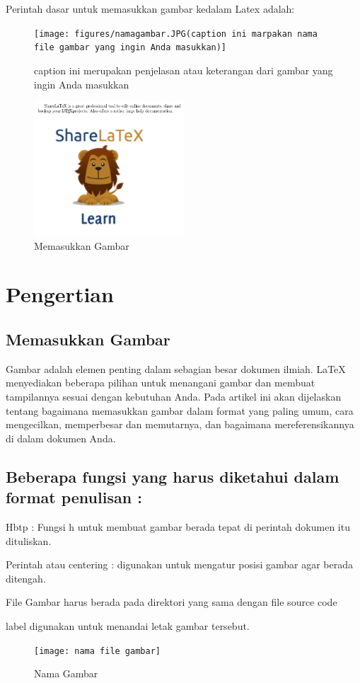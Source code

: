 Perintah dasar untuk memasukkan gambar kedalam Latex adalah:
\begin{figure}[ht]
\centerline{\texttt{[image: figures/namagambar.JPG(caption ini marpakan nama file gambar yang ingin Anda masukkan)]}}
\caption {caption ini merupakan penjelasan atau keterangan dari gambar yang ingin Anda masukkan}
\label{labelgambar}
\end{figure}


\begin{figure}[ht]
	\centerline{\includegraphics[width=0.50\textwidth]{gambar/dapi13.jpg}}
	\caption{Memasukkan Gambar}
	\label{Memasukkan Gambar}
\end{figure}

\section {Pengertian }
\subsection {Memasukkan Gambar}
{\fontsize{10pt}{10pt}\selectfont  \hspace*{0.64in} Gambar adalah elemen penting dalam sebagian besar dokumen ilmiah. LaTeX menyediakan beberapa pilihan untuk menangani gambar dan membuat tampilannya sesuai dengan kebutuhan Anda. Pada artikel ini akan dijelaskan tentang  bagaimana memasukkan gambar dalam format yang paling umum, cara mengecilkan, memperbesar dan memutarnya, dan bagaimana mereferensikannya di dalam dokumen Anda.} \par

\subsection {Beberapa fungsi yang harus diketahui dalam format penulisan :}
\item Hbtp : Fungsi h untuk membuat gambar berada tepat di perintah dokumen itu dituliskan. 
\item Perintah atau centering : digunakan untuk mengatur posisi gambar agar berada ditengah.
\item File Gambar harus berada pada direktori yang sama dengan file source code
\item label digunakan untuk menandai letak gambar tersebut.
\begin {figure}[!htbp]
\centering
\texttt{[image: nama file gambar]}
\caption {Nama Gambar}
\label {penanda}
\end {figure}

